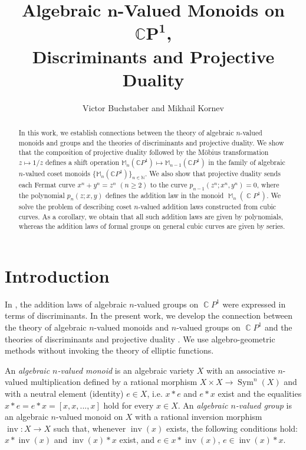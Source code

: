 \documentclass[14pt, dvipsnames]{extarticle}
\title{\bf Algebraic $\bm{n}$-Valued Monoids on $\bm{\mathbb{C}P^1}$,\\ 
Discriminants and Projective Duality}
\date{}
\author{Victor Buchstaber and Mikhail Kornev}
\theoremstyle{plain}
\theoremstyle{definition}
\theoremstyle{remark}
\DeclareMathOperator{\Sym}{\mathrm{Sym}}
\DeclareMathOperator{\inv}{\mathrm{inv}}
\DeclareMathOperator{\Cc}{\mathbb{C}}
\DeclareMathOperator{\M}{\mathbb{M}}
\begin{document}
\maketitle

\begin{abstract}
In this work, we establish connections between the theory of algebraic $n$-valued monoids and groups and the theories of discriminants and projective duality. We show that the composition of projective duality followed by the Möbius transformation $z\mapsto 1/z$ defines a shift operation $\mathbb{M}_n(\mathbb{C}P^1)\mapsto \mathbb{M}_{n-1}(\mathbb{C}P^1)$ in the family of algebraic $n$-valued coset monoids $\{\mathbb{M}_{n}(\mathbb{C}P^1)\}_{n\in\mathbb{N}}$. We also show that projective duality sends each Fermat curve $x^n+y^n=z^n$ $(n\ge 2)$ to the curve $p_{n-1}(z^n; x^n, y^n)=0$, where the polynomial $p_n(z;x,y)$ defines the addition law in the monoid $\M_n(\Cc\!P^1)$. We solve the problem of describing coset $n$-valued addition laws constructed from cubic curves. As a corollary, we obtain that all such addition laws are given by polynomials, whereas the addition laws of formal groups on general cubic curves are given by series.
\end{abstract}

\tableofcontents

\thispagestyle{empty}

\section{Introduction}\label{sec:intro}\label{intro}

In \cite{Kontsevich_type_polynomials, Gaiur}, the addition laws of algebraic $n$-valued groups on $\Cc\!P^1$ \cite{Buchstaber} were expressed in terms of discriminants. In the present work, we develop the connection between the theory of algebraic $n$-valued monoids and $n$-valued groups on $\Cc\!P^1$ and the theories of discriminants and projective duality \cite{Gelfand}. We use algebro-geometric methods without invoking the theory of elliptic functions.

An {\it algebraic $n$-valued monoid} is an algebraic variety $X$ with an associative $n$-valued multiplication defined by a rational morphism $X\times X\to \Sym^n(X)$ and with a neutral element (identity) $e\in X$, i.e. $x\ast e$ and $e\ast x$ exist and the equalities $x\ast e = e\ast x = [x, x, ..., x]$ hold for every $x\in X$. An {\it algebraic $n$-valued group} is an algebraic $n$-valued monoid on $X$ with a rational inversion morphism $\inv: X\to X$ such that, whenever $\inv(x)$ exists, the following conditions hold: $x\ast\inv(x)$ and $\inv(x)\ast x$ exist, and $e\in x\ast\inv(x)$, $e\in \inv(x)\ast x$.
\end{document}
